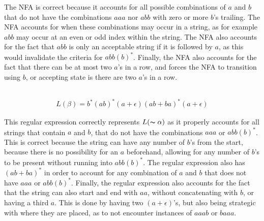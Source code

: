 \documentclass[letterpaper]{article}
\theoremstyle{plain}
\theoremstyle{definition}
\theoremstyle{remark}
\begin{document}
The NFA is correct because it accounts for all possible combinations of $a$ and $b$ that do not have the combinations $aaa$ nor $abb$ with zero or more $b$'s trailing. The NFA accounts for when these combinations may occur in a string, as for example $abb$ may occur at an even or odd index within the string. The NFA also accounts for the fact that $abb$ is only an acceptable string if it is followed by $a$, as this would invalidate the criteria for $abb(b)^*$. Finally, the NFA also accounts for the fact that there can be at most two $a$'s in a row, and forces the NFA to transition using $b$, or accepting state is there are two $a$'s in a row.

\subsection{}

\begin{align*}
    L(\beta)=b^*(ab)^*(a+\epsilon)(ab+ba)^*(a+\epsilon)
\end{align*}

This regular expression correctly represents $L(\thicksim\alpha)$ as it properly accounts for all strings that contain $a$ and $b$, that do not have the combinations $aaa$ or $abb(b)^*$. This is correct because the string can have any number of $b$'s from the start, because there is no possibility for an $a$ beforehand, allowing for any number of $b$'s to be present without running into $abb(b)^*$. The regular expression also has $(ab + ba)^*$ in order to account for any combination of $a$ and $b$ that does not have $aaa$ or $abb(b)^*$. Finally, the regular expression also accounts for the fact that the string can also start and end with $aa$, without concatenating with $b$, or having a third $a$. This is done by having two $(a+\epsilon)$'s, but also being strategic with where they are placed, as to not encounter instances of $aaab$ or $baaa$. 

\section{}
\end{document}
